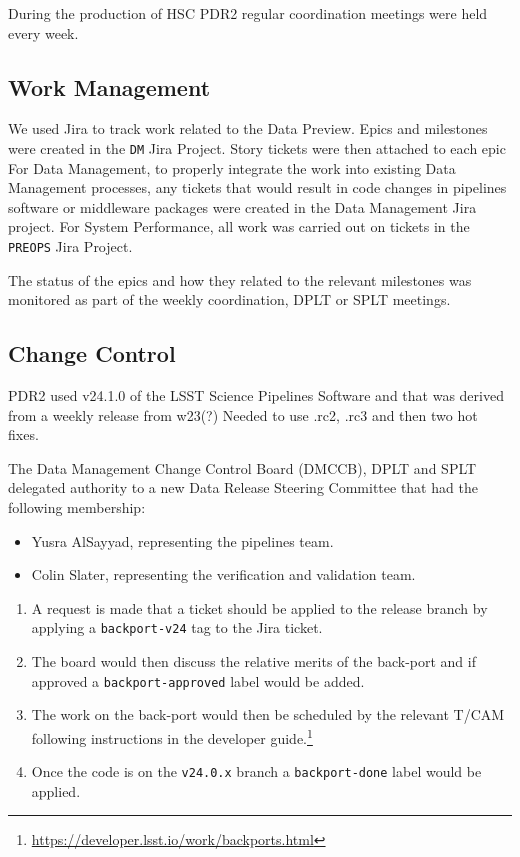 During the production of HSC PDR2 regular coordination meetings were held every week.

\subsection{Work Management}

We used Jira to track work related to the Data Preview.
Epics and milestones were created in the \texttt{DM} Jira Project.
Story tickets were then attached to each epic 
For Data Management, to properly integrate the work into existing Data Management processes, any tickets that would result in code changes in pipelines software or middleware packages were created in the Data Management Jira project.
For System Performance, all work was carried out on tickets in the  \texttt{PREOPS} Jira Project.

The status of the epics and how they related to the relevant milestones was monitored as part of the weekly coordination, DPLT or SPLT meetings.

\subsection{Change Control}

PDR2 used v24.1.0 of the LSST Science Pipelines Software and that was derived from a weekly release from w23(?)
Needed to use .rc2, .rc3 and then two hot fixes.

The Data Management Change Control Board (DMCCB), DPLT and SPLT  delegated authority to a new Data Release Steering Committee that had the following membership:

\begin{itemize}
\item Yusra AlSayyad, representing the pipelines team.
\item Colin Slater, representing the verification and validation team.
\end{itemize}

\begin{enumerate}

\item A request is made that a ticket should be applied to the release branch by applying a \texttt{backport-v24} tag to the Jira ticket.
\item The board would then discuss the relative merits of the back-port and if approved a \texttt{backport-approved} label would be added.
\item The work on the back-port would then be scheduled by the relevant T/CAM following instructions in the developer guide.\footnote{\url{https://developer.lsst.io/work/backports.html}}
\item Once the code is on the \texttt{v24.0.x} branch a \texttt{backport-done} label would be applied.

\end{enumerate}

